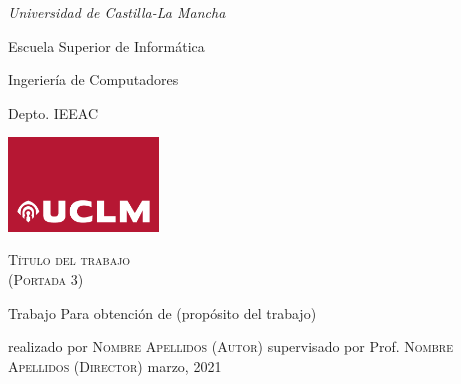 \documentclass[12pt,a4paper]{report}
\begin{document}
\begin{titlepage}
    \noindent\parbox[c]{.5\linewidth}{
    	\linespread{1.3}
    	\itshape Universidad de Castilla-La Mancha\par
    	Escuela Superior de Informática\par
        Ingeriería de Computadores\par
    	Depto. IEEAC\par
    }%
    \parbox[c]{.5\linewidth}{
    	\hfill\includegraphics[width=4cm]{uclm_logo}
    } 
    \centering
    \par\vspace{.15\textheight}
    {\huge\textsc{Título del trabajo \\
     (Portada 3)}\par}
    \Large
    \par\vspace{.1\textheight}
    Trabajo
    \medbreak
    Para obtención de
    (propósito del trabajo)
    \par\vspace{.08\textheight}
    realizado por
    \medbreak
    \textsc{Nombre Apellidos (Autor)}
    \bigbreak
    supervisado por
    \medbreak
    Prof. \textsc{Nombre Apellidos (Director)}
    \vfill
    \noindent%
    \small \hfill marzo, 2021 
\end{titlepage}
\end{document}
